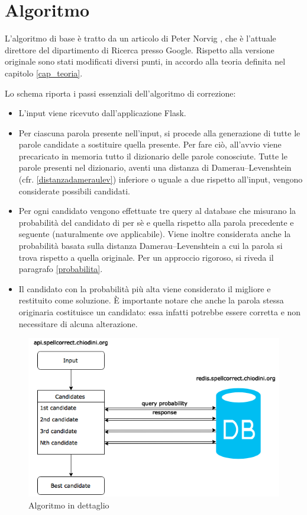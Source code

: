 \section{Algoritmo}
L'algoritmo di base è tratto da un articolo di Peter Norvig \cite{norvig}, che è l'attuale direttore del dipartimento di Ricerca presso Google. Rispetto alla versione originale sono stati modificati diversi punti, in accordo alla teoria definita nel capitolo \ref{cap_teoria}.

Lo schema riporta i passi essenziali dell'algoritmo di correzione:
\begin{itemize}
\item L'input viene ricevuto dall'applicazione Flask.
\item Per ciascuna parola presente nell'input, si procede alla generazione di tutte le parole candidate a sostituire quella presente. Per fare ciò, all'avvio viene precaricato in memoria tutto il dizionario delle parole conosciute. Tutte le parole presenti nel dizionario, aventi una distanza di  Damerau–Levenshtein (cfr. \ref{distanzadameraulev}) inferiore o uguale a due rispetto all'input, vengono considerate possibili candidati.
\item Per ogni candidato vengono effettuate tre query al database che misurano la probabilità del candidato di per sè e quella rispetto alla parola precedente e seguente (naturalmente ove applicabile). Viene inoltre considerata anche la probabilità basata sulla distanza Damerau–Levenshtein a cui la parola si trova rispetto a quella originale. Per un approccio rigoroso, si riveda il paragrafo \ref{probabilita}.
\item Il candidato con la probabilità più alta viene considerato il migliore e restituito come soluzione. È importante notare che anche la parola stessa originaria costituisce un candidato: essa infatti potrebbe essere corretta e non necessitare di alcuna alterazione.
\end{itemize}
\begin{figure}[h]
\centering
\includegraphics[width=\textwidth]{Figures/original_algorithm.png}
\caption{Algoritmo in dettaglio}
\label{fig:algoritmo}
\end{figure}

